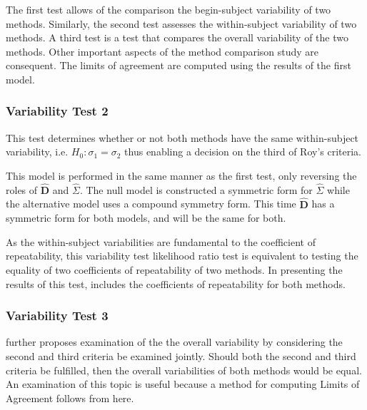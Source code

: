 \documentclass[12pt, a4paper]{report}
\theoremstyle{plain}
\theoremstyle{definition}
\theoremstyle{remark}
\begin{document}
	
	
	The first test allows of the comparison the begin-subject variability of two methods. Similarly, the second test assesses the within-subject variability of two methods. A third test is a test that compares the overall variability of the two methods. Other important aspects of the method comparison study are consequent. The limits of agreement are computed using the results of the first model.
	
	
	\subsubsection{Variability Test 2}
	
	This test determines whether or not both methods have the same within-subject variability, i.e. $H_{0}: \sigma_{1}  = \sigma_{2}$ thus enabling a decision on the third of Roy's criteria.
	
	This model is performed in the same manner as the first test, only reversing the roles of ${\hat{\boldsymbol{D}}}$ and ${\hat{\Sigma}}$. The null model is constructed a symmetric form for ${\hat{\Sigma}}$ while the alternative model uses a compound symmetry form. This time ${\hat{\boldsymbol{D}}}$ has a symmetric form for both models, and will be the same for both.
	
	As the within-subject variabilities are fundamental to the coefficient of repeatability, this variability test likelihood ratio test is equivalent to testing the equality of two coefficients of repeatability of two methods. In presenting the results of this test, \citet{ARoy2009} includes the coefficients of repeatability for both methods.
	
	
	\subsubsection{Variability Test 3}
\citet{ARoy2009} further proposes examination of the the overall variability by considering the second and third criteria be examined jointly. Should both the second and third criteria be fulfilled, then the overall variabilities of both methods would be equal. An examination of this topic is useful because a method for computing Limits of Agreement follows from here.
	
\end{document}
